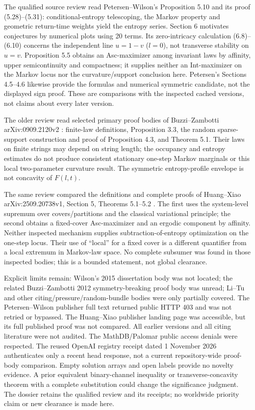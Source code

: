 \documentclass[11pt]{article}
\begin{document}
The qualified source review read Petersen--Wilson's Proposition 5.10 and its proof (5.28)--(5.31): conditional-entropy telescoping, the Markov property and geometric return-time weights yield the entropy series. Section 6 motivates conjectures by numerical plots using 20 terms. Its zero-intricacy calculation (6.8)--(6.10) concerns the independent line $u=1-v$ ($l=0$), not transverse stability on $u=v$. Proposition 5.5 obtains an Asc-maximizer among invariant laws by affinity, upper semicontinuity and compactness; it supplies neither an Int-maximizer on the Markov locus nor the curvature/support conclusion here. Petersen's Sections 4.5--4.6 likewise provide the formulas and numerical symmetric candidate, not the displayed sign proof. These are comparisons with the inspected cached versions, not claims about every later version.

The older review read selected primary proof bodies of Buzzi--Zambotti arXiv:0909.2120v2 \cite{BZ}: finite-law definitions, Proposition 3.3, the random sparse-support construction and proof of Proposition 4.3, and Theorem 5.1. Their laws on finite strings may depend on string length; the occupancy and entropy estimates do not produce consistent stationary one-step Markov marginals or this local two-parameter curvature result. The symmetric entropy-profile envelope is not concavity of $F(l,t)$.

The same review compared the definitions and complete proofs of Huang--Xiao arXiv:2509.20738v1, Section 5, Theorems 5.1--5.2 \cite{HX}. The first uses the system-level supremum over covers/partitions and the classical variational principle; the second obtains a fixed-cover Asc-maximizer and an ergodic component by affinity. Neither inspected mechanism supplies subtraction-of-entropy optimization on the one-step locus. Their use of ``local'' for a fixed cover is a different quantifier from a local extremum in Markov-law space. No complete subsumer was found in those inspected bodies; this is a bounded statement, not global clearance.

Explicit limits remain: Wilson's 2015 dissertation body was not located; the related Buzzi--Zambotti 2012 symmetry-breaking proof body was unread; Li--Tu and other citing/pressure/random-bundle bodies were only partially covered. The Petersen--Wilson publisher full text returned public HTTP 403 and was not retried or bypassed. The Huang--Xiao publisher landing page was accessible, but its full published proof was not compared. All earlier versions and all citing literature were not audited. The MathDB/Palomar public access denials were respected. The reused OpenAI registry receipt dated 1 November 2026 authenticates only a recent head response, not a current repository-wide proof-body comparison. Empty solution arrays and open labels provide no novelty evidence. A prior equivalent binary-channel inequality or transverse-concavity theorem with a complete substitution could change the significance judgment. The dossier retains the qualified review and its receipts; no worldwide priority claim or new clearance is made here.
\end{document}
